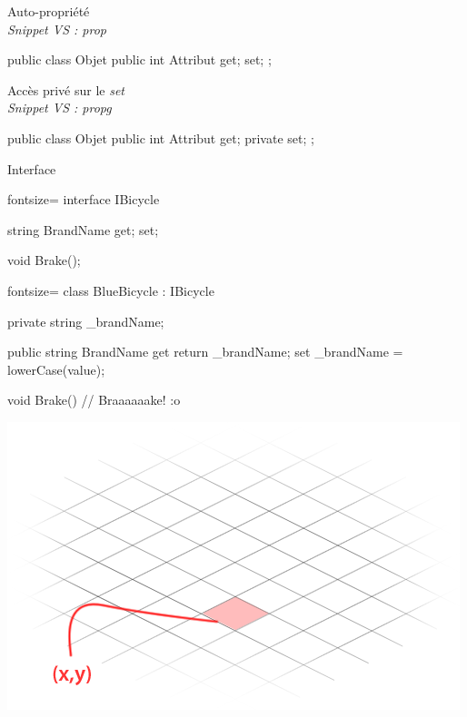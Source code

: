 \begin{frame}[fragile]
    \begin{center}
        {\large Auto-propriété}\\
        \emph{\scriptsize Snippet VS : prop}
    \end{center}
    \begin{csharpcode}
public class Objet
{
    public int Attribut { get; set; };
}
    \end{csharpcode}
    \pause
    \begin{center}
        {\large Accès privé sur le \emph{set}}\\
        \emph{\scriptsize Snippet VS : propg}
    \end{center}
    \begin{csharpcode}
public class Objet
{
    public int Attribut { get; private set; };
}
    \end{csharpcode}
\end{frame}

\begin{frame}[fragile]
    \begin{center}{\large Interface}\end{center}
    \begin{csharpcode*}{fontsize=\scriptsize}
interface IBicycle
{
     string BrandName { get; set; }

     void Brake();
}
    \end{csharpcode*}
    \pause
    \begin{csharpcode*}{fontsize=\scriptsize}
class BlueBicycle : IBicycle
{
    private string _brandName;

    public string BrandName {
        get { return _brandName; }
        set { _brandName = lowerCase(value); }
    }

    void Brake() {
        // Braaaaaake! :o
    }
}
    \end{csharpcode*}
\end{frame}

\begingroup
{}
\begin{frame}
  \begin{center}
      \vspace{1.1cm}\includegraphics[scale=0.4]{img/map.png}
  \end{center}
\end{frame}


